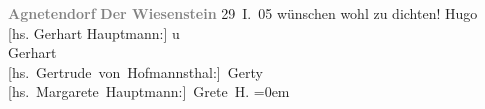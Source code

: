 \begin{ledgroupsized}[t]{13cm}
           \noindent{}\centering{}\textcolor{gray}{\textbf{{\pb}Agnetendorf}}\pend
           \pstart
           \noindent{}\centering{}\textcolor{gray}{\textbf{\label{T_L01497-1v}\label{T_L01497-1h}}}\pend
           \pstart
           \noindent{}\centering{}\textcolor{gray}{\textbf{Der Wiesenstein}}\pend
           \pstart
           \raggedleft{}29 I. 05\pend
           \pstart
           wünschen wohl zu dichten!\pend
           \pstart
           \spacefill\mbox{Hugo}{\\[\baselineskip]}{[}hs. Gerhart Hauptmann:{]} u{\\[\baselineskip]}\spacefill\mbox{Gerhart}{\\[\baselineskip]}\spacefill\mbox{{[}hs. Gertrude von Hofmannsthal:{]} Gerty}{\\[\baselineskip]}\spacefill\mbox{{[}hs. Margarete Hauptmann:{]} Grete H.}\pend
           \leftskip=0em{}
         
         \endnumbering{}\end{ledgroupsized}  \newcommand{\dateiname}{L01497}\newcommand{\titel}{Hugo und Gerty von Hofmannsthal, Gerhart und Margarete Hauptmann an Arthur Schnitzler, 29. 1. 1905}\newcommand{\editorInnen}{Martin Anton Müller und Gerd-Hermann Susen}
      